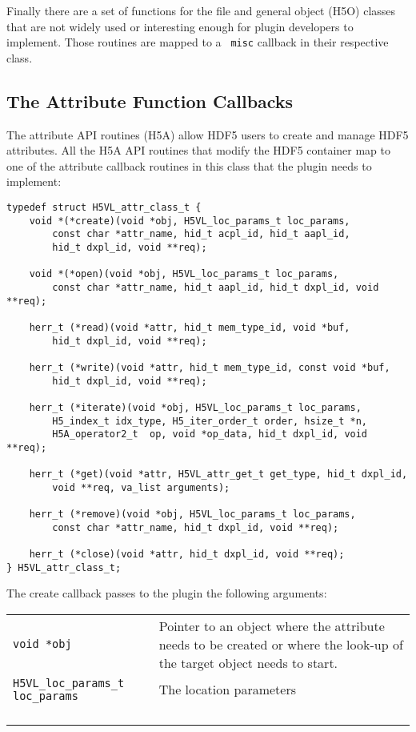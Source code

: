 \documentclass[10pt,a4paper]{article}
\begin{document}
Finally there are a set of functions for the file and general object
(H5O) classes that are not widely used or interesting enough for
plugin developers to implement. Those routines are mapped to a {\tt
  misc} callback in their respective class.

\subsection{The Attribute Function Callbacks}
The attribute API routines (H5A) allow HDF5 users to create and manage
HDF5 attributes. All the H5A API routines that modify the HDF5
container map to one of the attribute callback routines in this
class that the plugin needs to implement:

\begin{lstlisting}
typedef struct H5VL_attr_class_t {
    void *(*create)(void *obj, H5VL_loc_params_t loc_params, 
        const char *attr_name, hid_t acpl_id, hid_t aapl_id, 
        hid_t dxpl_id, void **req);

    void *(*open)(void *obj, H5VL_loc_params_t loc_params, 
        const char *attr_name, hid_t aapl_id, hid_t dxpl_id, void **req);

    herr_t (*read)(void *attr, hid_t mem_type_id, void *buf, 
        hid_t dxpl_id, void **req);

    herr_t (*write)(void *attr, hid_t mem_type_id, const void *buf, 
        hid_t dxpl_id, void **req);

    herr_t (*iterate)(void *obj, H5VL_loc_params_t loc_params,
        H5_index_t idx_type, H5_iter_order_t order, hsize_t *n, 
        H5A_operator2_t  op, void *op_data, hid_t dxpl_id, void **req);

    herr_t (*get)(void *attr, H5VL_attr_get_t get_type, hid_t dxpl_id, 
        void **req, va_list arguments);

    herr_t (*remove)(void *obj, H5VL_loc_params_t loc_params, 
        const char *attr_name, hid_t dxpl_id, void **req);

    herr_t (*close)(void *attr, hid_t dxpl_id, void **req);
} H5VL_attr_class_t;
\end{lstlisting}

The create callback passes to the plugin the following arguments:

\begin{tabular}{l p{10cm}}
  {\tt void *obj} & Pointer to an object where the attribute needs
  to be created or where the look-up of the target object needs to
  start. \\
  {\tt H5VL\_loc\_params\_t loc\_params} & The location parameters \\
  {\tt } & \\
  {\tt } & \\
  {\tt } & \\
  {\tt } & \\
\end{tabular}
\end{document}
